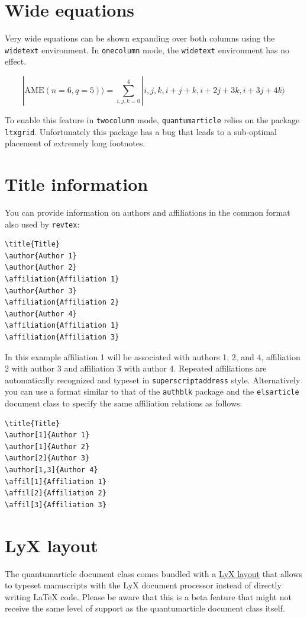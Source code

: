 \documentclass[a4paper,twocolumn,11pt]{quantumarticle}
\begin{document}
\section{Wide equations}
Very wide equations can be shown expanding over both columns using the \texttt{widetext} environment.
In \texttt{onecolumn} mode, the \texttt{widetext} environment has no effect.
\begin{widetext}
  \begin{equation}
|\mathrm{AME}(n=6,q=5)\rangle=\sum_{i,j,k=0}^4 |i,j,k,i+j+k,i+2j+3k,i+3j+4k\rangle
  \end{equation}
\end{widetext}
To enable this feature in \texttt{twocolumn} mode, \texttt{quantumarticle} relies on the package \texttt{ltxgrid}.
Unfortunately this package has a bug that leads to a sub-optimal placement of extremely long footnotes.

\section{Title information}
\label{sec:title-information}
You can provide information on authors and affiliations in the common format also used by \texttt{revtex}:
\begin{verbatim}
\title{Title}
\author{Author 1}
\author{Author 2}
\affiliation{Affiliation 1}
\author{Author 3}
\affiliation{Affiliation 2}
\author{Author 4}
\affiliation{Affiliation 1}
\affiliation{Affiliation 3}
\end{verbatim}
In this example affiliation 1 will be associated with authors 1, 2, and 4, affiliation 2 with author 3 and affiliation 3 with author 4.
Repeated affiliations are automatically recognized and typeset in \texttt{superscriptaddress} style.
Alternatively you can use a format similar to that of the \texttt{authblk} package and the \texttt{elsarticle} document class to specify the same affiliation relations as follows:
\begin{verbatim}
\title{Title}
\author[1]{Author 1}
\author[1]{Author 2}
\author[2]{Author 3}
\author[1,3]{Author 4}
\affil[1]{Affiliation 1}
\affil[2]{Affiliation 2}
\affil[3]{Affiliation 3}
\end{verbatim}

\section{LyX layout}
\label{sec:lyx-layout}

The quantumarticle document class comes bundled with a \href{https://raw.githubusercontent.com/quantum-journal/quantum-journal/master/quantum-lyx-template.lyx}{LyX layout} that allows to typeset manuscripts with the LyX document processor instead of directly writing LaTeX code. Please be aware that this is a beta feature that might not receive the same level of support as the quantumarticle document class itself.
\end{document}
